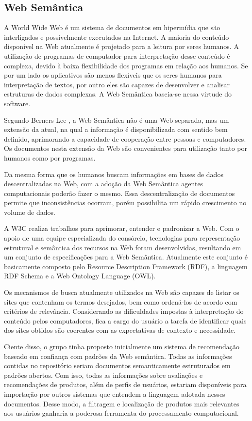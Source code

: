 \subsection{Web Semântica} %
\label{sub:web_semantica}

 A World Wide Web é um sistema de documentos em hipermídia que são interligados e possivelmente executados na Internet. A maioria do conteúdo disponível na Web atualmente é projetado para a leitura por seres humanos. A utilização de programas de computador para interpretação desse conteúdo é complexa, devido à baixa flexibilidade dos programas em relação aos humanos. Se por um lado os aplicativos são menos flexíveis que os seres humanos para interpretação de textos, por outro eles são capazes de desenvolver e analisar estruturas de dados complexas. A Web Semântica baseia-se nessa virtude do software. 

 Segundo Berners-Lee \cite{bemerslee2001sw}, a Web Semântica não é uma Web separada, mas um extensão da atual, na qual a informação é disponibilizada com sentido bem definido, aprimorando a capacidade de cooperação entre pessoas e computadores. Os documentos nesta extensão da Web são convenientes para utilização tanto por humanos como por programas.

 Da mesma forma que os humanos buscam informações em bases de dados descentralizadas na Web, com a adoção da Web Semântica agentes computacionais poderão fazer o mesmo. Essa descentralização de documentos permite que inconsistências ocorram, porém possibilita um rápido crescimento no volume de dados.

 A W3C realiza trabalhos para aprimorar, entender e padronizar a Web. Com o apoio de uma equipe especializada do consórcio, tecnologias para representação estrutural e semântica dos recursos na Web foram desenvolvidas, resultando em um conjunto de especificações para a Web Semântica. Atualmente este conjunto é basicamente composto pelo Resource Description Framework (RDF), a linguagem RDF Schema e a Web Ontology Language (OWL).

 Os mecanismos de busca atualmente utilizados na Web são capazes de listar os sites que contenham os termos desejados, bem como ordená-los de acordo com critérios de relevância. Considerando as dificuldades impostas à interpretação do conteúdo pelos computadores, fica a cargo do usuário a tarefa de identificar quais dos sites obtidos são coerentes com as expectativas de contexto e necessidade.

 Ciente disso, o grupo tinha proposto inicialmente um sistema de recomendação baseado em confiança com padrões da Web semântica. Todas as informações contidas no repositório seriam documentos semanticamente estruturados em padrões abertos. Com isso, todas as informações sobre avaliações e recomendações de produtos, além de perfis de usuários, estariam disponíveis para importação por outros sistemas que entendem a linguagem adotada nesses documentos. Desse modo, a filtragem e localização de produtos mais relevantes aos usuários ganharia a poderosa ferramenta do processamento computacional.

